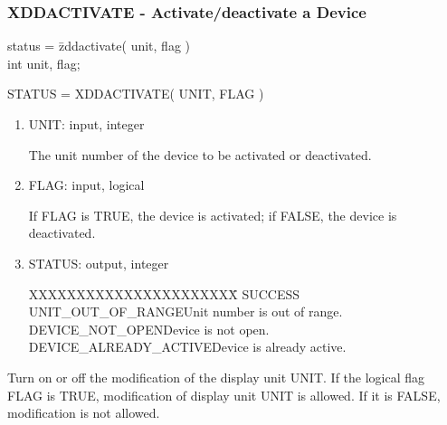 \subsubsection{XDDACTIVATE - Activate/deactivate a Device}
\begin{tabbing}
status = \=zddactivate( unit, flag )\\
\>int  unit, flag;\\
\end{tabbing}
STATUS = XDDACTIVATE( UNIT, FLAG )
\begin{enumerate}
\item UNIT:  input, integer

The unit number of the device to be activated or deactivated.
\item FLAG:  input, logical

If FLAG is TRUE, the device is activated; if FALSE, the device is
deactivated.
\item STATUS:  output, integer
\begin{tabbing}
XXXXXXXXXXXXXXXXXXXXXX\=\kill
SUCCESS\\
UNIT\_OUT\_OF\_RANGE\>Unit number is out of range.\\
DEVICE\_NOT\_OPEN\>Device is not open.\\
DEVICE\_ALREADY\_ACTIVE\>Device is already active.\\
\end{tabbing}
\end{enumerate}
Turn on or off the modification of the display unit UNIT.  If the
logical flag FLAG is TRUE, modification of display unit UNIT is
allowed.  If it is FALSE, modification is not allowed.
\newpage
